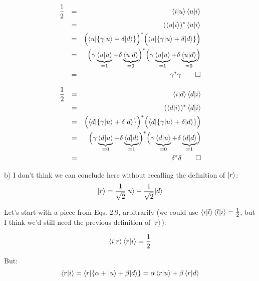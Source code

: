 \documentclass[solutions.tex]{subfiles}
\begin{document}
\begin{equation*}\begin{aligned}
	\frac12 &&=&& \left\langle i \middle| u \right\rangle\left\langle u \middle| i \right\rangle \\
	~ &&=&& (\left\langle u \middle| i \right\rangle)^*\left\langle u \middle| i \right\rangle \\
	~ &&=&& \Bigl(\langle u|\{\gamma|u\rangle + \delta|d\rangle\}\Bigr)^*
		\Bigl(\langle u|\{\gamma|u\rangle + \delta|d\rangle\}\Bigr) \\
	~ &&=&& \Bigl(\gamma\underbrace{\left\langle u \middle| u \right\rangle}_{=1} +
			\delta\underbrace{\left\langle u \middle| d \right\rangle}_{=0}\Bigr)^*
		\Bigl(\gamma\underbrace{\left\langle u \middle| u \right\rangle}_{=1} +
			\delta\underbrace{\left\langle u \middle| d \right\rangle}_{=0}\Bigr) \\
	~ &&=&& \gamma^*\gamma\qed
\end{aligned}\end{equation*}

\begin{equation*}\begin{aligned}
	\frac12 &&=&& \left\langle i \middle| d \right\rangle\left\langle d \middle| i \right\rangle \\
	~ &&=&& (\left\langle d \middle| i \right\rangle)^*\left\langle d \middle| i \right\rangle \\
	~ &&=&& \Bigl(\langle d|\{\gamma|u\rangle + \delta|d\rangle\}\Bigr)^*
		\Bigl(\langle d|\{\gamma|u\rangle + \delta|d\rangle\}\Bigr) \\
	~ &&=&& \Bigl(\gamma\underbrace{\left\langle d \middle| u \right\rangle}_{=0} +
			\delta\underbrace{\left\langle d \middle| d \right\rangle}_{=1}\Bigr)^*
		\Bigl(\gamma\underbrace{\left\langle d \middle| u \right\rangle}_{=0} +
			\delta\underbrace{\left\langle d \middle| d \right\rangle}_{=1}\Bigr) \\
	~ &&=&& \delta^*\delta\qed
\end{aligned}\end{equation*}

\hrr

b) I don't think we can conclude here without recalling the
definition of $|r\rangle$:
\[
	|r\rangle = \frac1{\sqrt2}|u\rangle + \frac1{\sqrt2}|d\rangle
\]

Let's start with a piece from Eqs. $2.9$, arbitrarily (we could
use $\left\langle i \middle| l \right\rangle\left\langle l \middle| i \right\rangle = \frac1{2}$, but I think we'd
still need the previous definition of $|r\rangle$):

\begin{equation*}\begin{aligned}
\left\langle i \middle| r \right\rangle\left\langle r \middle| i \right\rangle = \frac1{2}
\end{aligned}\end{equation*}

But:
\[
	\left\langle r \middle| i \right\rangle = \langle r|\{\alpha + |u\rangle+\beta|d\rangle\}
		= \alpha\left\langle r \middle| u \right\rangle + \beta\left\langle r \middle| d \right\rangle
\]
\end{document}
